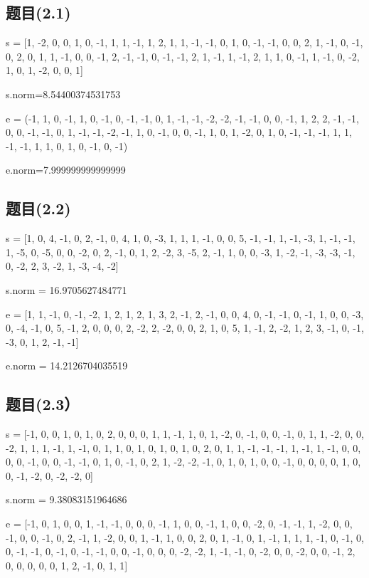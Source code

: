 \documentclass[12pt,a4paper]{article}
\numberwithin{equation}{section}
\begin{document}
\subsection{题目(2.1)}

s = [1, -2, 0, 0, 1, 0, -1, 1, 1, -1, 1, 2, 1, 1,
-1, -1, 0, 1, 0, -1, -1, 0, 0, 2, 1, -1, 0, -1, 0, 2, 0, 1,
1, -1, 0, 0, -1, 2, -1, -1, 0, -1, -1, 2, 1, -1, 1, -1, 2, 1, 1, 0,
-1, 1, -1, 0, -2, 1, 0, 1, -2, 0, 0, 1]

s.norm=8.54400374531753

e = (-1, 1, 0, -1, 1, 0, -1, 0, -1, -1, 0, 1, -1, -1, -2, -2, -1, -1, 0, 0, -1, 1, 2, 2, -1,
-1, 0, 0, -1, -1, 0, 1, -1, -1, -2, -1, 1, 0, -1, 0, 0, -1, 1, 0, 1, -2, 0, 1, 0, -1, -1,
-1, 1, 1, -1, -1, 1, 1, 0, 1, 0, -1, 0, -1)

e.norm=7.999999999999999

\subsection{题目(2.2)}

s = [1, 0, 4, -1, 0, 2, -1, 0, 4, 1, 0, -3, 1, 1, 1, -1, 0, 0, 5, -1, -1, 1, -1, -3, 1, -1, -1, 1, -5, 0, -5, 0, 0, -2, 0, 2, -1, 0, 1, 2, -2, 3, -5, 2, -1, 1, 0, 0, -3, 1, -2, -1, -3, -3, -1, 0, -2, 2, 3, -2, 1, -3, -4, -2]

s.norm = 16.9705627484771

e = [1, 1, -1, 0, -1, -2, 1, 2, 1, 2, 1, 3, 2, -1, 2, -1, 0, 0, 4, 0, -1, -1, 0, -1, 1, 0, 0, -3, 0, -4, -1, 0, 5, -1, 2, 0, 0, 0, 2, -2, 2, -2, 0, 0, 2, 1, 0, 5, 1, -1, 2, -2, 1, 2, 3, -1, 0, -1, -3, 0, 1, 2, -1, -1]

e.norm = 14.2126704035519

\subsection{题目(2.3）}

s = [-1, 0, 0, 1, 0, 1, 0, 2, 0, 0, 0, 1, 1, -1, 1, 0, 1, -2, 0, -1, 0, 0, -1, 0, 1, 1, -2, 0, 0, -2, 1, 1, 1, -1, 1, -1, 0, 1, 1, 0, 1, 0, 1, 0, 1, 0, 2, 0, 1, 1, -1, -1, -1, 1, -1, 1, -1, 0, 0, 0, 0, -1, 0, 0, -1, -1, 0, 1, 0, -1, 0, 2, 1, -2, -2, -1, 0, 1, 0, 1, 0, 0, -1, 0, 0, 0, 0, 1, 0, 0, -1, -2, 0, -2, -2, 0]

s.norm = 9.38083151964686

e = [-1, 0, 1, 0, 0, 1, -1, -1, 0, 0, 0, -1, 1, 0, 0, -1, 1, 0, 0, -2, 0, -1, -1, 1, -2, 0, 0, -1, 0, 0, -1, 0, 2, -1, 1, -2, 0, 0, 1, -1, 1, 0, 0, 2, 0, 1, -1, 0, 1, -1, 1, 1, 1, -1, 0, -1, 0, 0, -1, -1, 0, -1, 0, -1, -1, 0, 0, -1, 0, 0, 0, -2, -2, 1, -1, -1, 0, -2, 0, 0, -2, 0, 0, -1, 2, 0, 0, 0, 0, 0, 1, 2, -1, 0, 1, 1]
\end{document}
